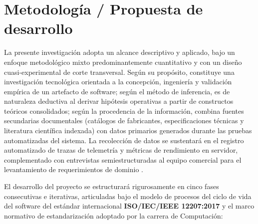 \section{Metodología / Propuesta de desarrollo}

La presente investigación adopta un alcance descriptivo y aplicado, bajo un enfoque metodológico mixto predominantemente cuantitativo y con un diseño cuasi-experimental de corte transversal. Según su propósito, constituye una investigación tecnológica orientada a la concepción, ingeniería y validación empírica de un artefacto de software; según el método de inferencia, es de naturaleza deductiva al derivar hipótesis operativas a partir de constructos teóricos consolidados; según la procedencia de la información, combina fuentes secundarias documentales (catálogos de fabricantes, especificaciones técnicas y literatura científica indexada) con datos primarios generados durante las pruebas automatizadas del sistema. La recolección de datos se sustentará en el registro automatizado de trazas de telemetría y métricas de rendimiento en servidor, complementado con entrevistas semiestructuradas al equipo comercial para el levantamiento de requerimientos de dominio \parencite{Llerena-Izquierdo_Ayala-Carabajo_2022}.

El desarrollo del proyecto se estructurará rigurosamente en cinco fases consecutivas e iterativas, articuladas bajo el modelo de procesos del ciclo de vida del software del estándar internacional \textbf{ISO/IEC/IEEE 12207:2017} \parencite{iso12207} y el marco normativo de estandarización adoptado por la carrera de Computación:

